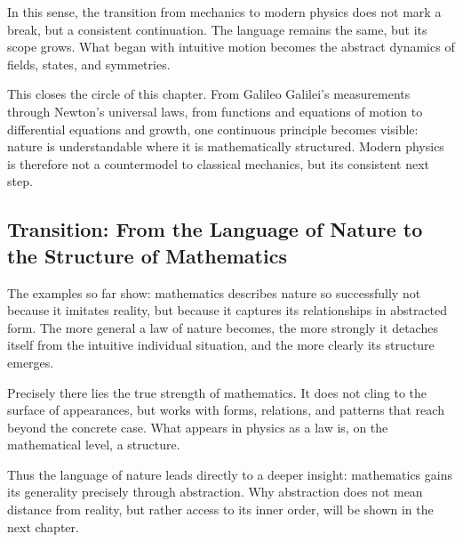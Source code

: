 In this sense, the transition from mechanics to modern physics
does not mark a break,
but a consistent continuation.
The language remains the same,
but its scope grows.
What began with intuitive motion
becomes the abstract dynamics
of fields, states, and symmetries.

This closes the circle of this chapter.
From Galileo Galilei's measurements
through Newton's universal laws,
from functions
and equations of motion
to differential equations and growth,
one continuous principle becomes visible:
nature is understandable
where it is mathematically structured.
Modern physics is therefore not a countermodel to classical mechanics,
but its consistent next step.

\subsection*{Transition: From the Language of Nature to the Structure of Mathematics}

The examples so far show:
mathematics describes nature so successfully
not because it imitates reality,
but because it captures its relationships in abstracted form.
The more general a law of nature becomes,
the more strongly it detaches itself from the intuitive individual situation,
and the more clearly its structure emerges.

Precisely there lies the true strength of mathematics.
It does not cling to the surface of appearances,
but works with forms, relations, and patterns
that reach beyond the concrete case.
What appears in physics as a law
is, on the mathematical level, a structure.

Thus the language of nature leads directly
to a deeper insight:
mathematics gains its generality
precisely through abstraction.
Why abstraction does not mean distance from reality,
but rather access to its inner order,
will be shown in the next chapter.